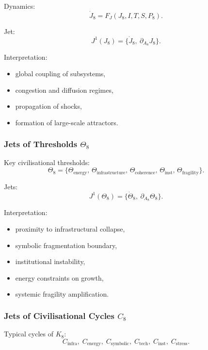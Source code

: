 Dynamics:
\[
\dot{J}_8 = F_J(J_8, I, T, S, P_8).
\]

Jet:
\[
J^1(J_8)=\{\dot{J}_8,\ \partial_{A_8}J_8\}.
\]

Interpretation:
\begin{itemize}
    \item global coupling of subsystems,
    \item congestion and diffusion regimes,
    \item propagation of shocks,
    \item formation of large-scale attractors.
\end{itemize}


\subsubsection{Jets of Thresholds \texorpdfstring{$\Theta_8$}{\Theta_8}}

Key civilisational thresholds:
\[
\Theta_8=
\{
\Theta_{\mathrm{energy}},\,
\Theta_{\mathrm{infrastructure}},\,
\Theta_{\mathrm{coherence}},\,
\Theta_{\mathrm{inst}},\,
\Theta_{\mathrm{fragility}}
\}.
\]

Jets:
\[
J^1(\Theta_8)=\{\dot{\Theta}_8,\ \partial_{A_8}\Theta_8\}.
\]

Interpretation:
\begin{itemize}
    \item proximity to infrastructural collapse,
    \item symbolic fragmentation boundary,
    \item institutional instability,
    \item energy constraints on growth,
    \item systemic fragility amplification.
\end{itemize}


\subsubsection{Jets of Civilisational Cycles \texorpdfstring{$C_8$}{C_8}}

Typical cycles of $K_8$:
\[
C_{\mathrm{infra}},\;
C_{\mathrm{energy}},\;
C_{\mathrm{symbolic}},\;
C_{\mathrm{tech}},\;
C_{\mathrm{inst}},\;
C_{\mathrm{stress}}.
\]

